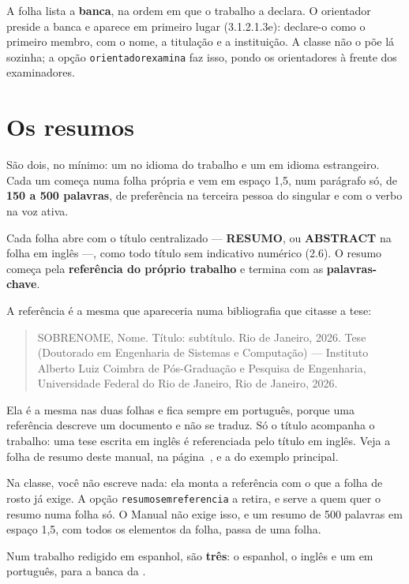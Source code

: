 \documentclass[dsc]{ufrj}
\begin{document}
  A folha lista a \textbf{banca}, na ordem em que o trabalho a declara. O
  orientador preside a banca e aparece em primeiro lugar (3.1.2.1.3e): declare-o
  como o primeiro membro, com o nome, a titulação e a instituição. A classe não o
  põe lá sozinha; a opção \verb|orientadorexamina| faz isso, pondo os
  orientadores à frente dos examinadores.

  \section{Os resumos}

  São dois, no mínimo: um no idioma do trabalho e um em idioma estrangeiro. Cada
  um começa numa folha própria e vem em espaço 1,5, num parágrafo só, de
  \textbf{150 a 500 palavras}, de preferência na terceira pessoa do singular e
  com o verbo na voz ativa.

  Cada folha abre com o título centralizado --- \textbf{RESUMO}, ou
  \textbf{ABSTRACT} na folha em inglês ---, como todo título sem indicativo
  numérico (2.6). O resumo começa pela \textbf{referência do próprio trabalho} e
  termina com as \textbf{palavras-chave}.

  A referência é a mesma que apareceria numa bibliografia que citasse a tese:

  \begin{quote}
    \singlespacing\small
    SOBRENOME, Nome. Título: subtítulo. Rio de Janeiro, 2026. Tese (Doutorado em
    Engenharia de Sistemas e Computação) --- Instituto Alberto Luiz Coimbra de
    Pós-Graduação e Pesquisa de Engenharia, Universidade Federal do Rio de
    Janeiro, Rio de Janeiro, 2026.
  \end{quote}

  Ela é a mesma nas duas folhas e fica sempre em português, porque uma
  referência descreve um documento e não se traduz. Só o título acompanha o
  trabalho: uma tese escrita em inglês é referenciada pelo título em inglês.
  Veja a folha de resumo deste manual, na página~\pageref{norma:resumo}, e a
  do exemplo principal.

  Na classe, você não escreve nada: ela monta a referência com o que a folha de
  rosto já exige. A opção \verb|resumosemreferencia| a retira, e serve a quem
  quer o resumo numa folha só. O Manual não exige isso, e um resumo de 500
  palavras em espaço 1,5, com todos os elementos da folha, passa de uma folha.

  Num trabalho redigido em espanhol, são \textbf{três}: o espanhol, o inglês e um
  em português, para a banca da .
\end{document}
